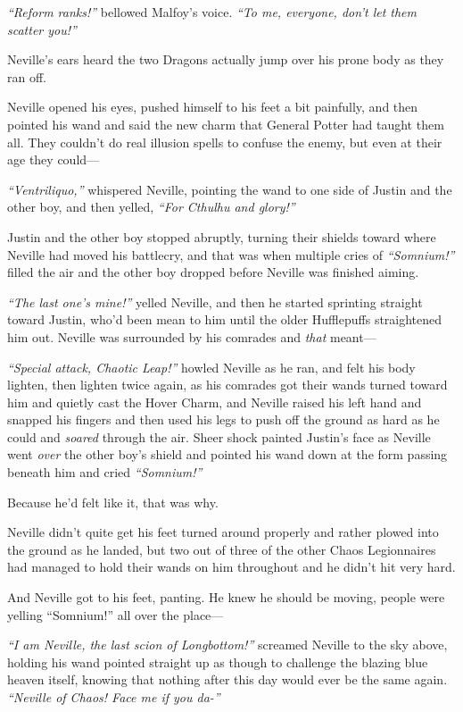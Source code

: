 \emph{``Reform ranks!''} bellowed Malfoy's voice. \emph{``To me,
everyone, don't let them scatter you!''}

Neville's ears heard the two Dragons actually jump over his prone body
as they ran off.

Neville opened his eyes, pushed himself to his feet a bit painfully, and
then pointed his wand and said the new charm that General Potter had
taught them all. They couldn't do real illusion spells to confuse the
enemy, but even at their age they could---

\emph{``Ventriliquo,''} whispered Neville, pointing the wand to one side
of Justin and the other boy, and then yelled, \emph{``For Cthulhu and
glory!''}

Justin and the other boy stopped abruptly, turning their shields toward
where Neville had moved his battlecry, and that was when multiple cries
of \emph{``Somnium!''} filled the air and the other boy dropped before
Neville was finished aiming.

\emph{``The last one's mine!''} yelled Neville, and then he started
sprinting straight toward Justin, who'd been mean to him until the older
Hufflepuffs straightened him out. Neville was surrounded by his comrades
and \emph{that} meant---

\emph{``Special attack, Chaotic Leap!''} howled Neville as he ran, and
felt his body lighten, then lighten twice again, as his comrades got
their wands turned toward him and quietly cast the Hover Charm, and
Neville raised his left hand and snapped his fingers and then used his
legs to push off the ground as hard as he could and \emph{soared}
through the air. Sheer shock painted Justin's face as Neville went
\emph{over} the other boy's shield and pointed his wand down at the form
passing beneath him and cried \emph{``Somnium!''}

Because he'd felt like it, that was why.

Neville didn't quite get his feet turned around properly and rather
plowed into the ground as he landed, but two out of three of the other
Chaos Legionnaires had managed to hold their wands on him throughout and
he didn't hit very hard.

And Neville got to his feet, panting. He knew he should be moving,
people were yelling ``Somnium!'' all over the place---

\emph{``I am Neville, the last scion of Longbottom!''} screamed Neville
to the sky above, holding his wand pointed straight up as though to
challenge the blazing blue heaven itself, knowing that nothing after
this day would ever be the same again. \emph{``Neville of Chaos! Face me
if you da-''}

